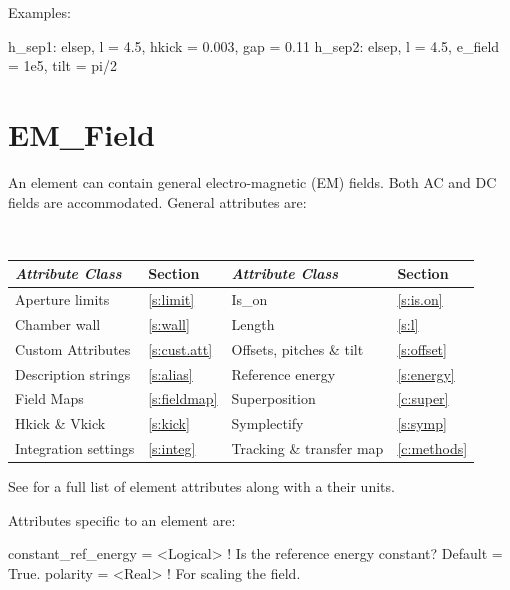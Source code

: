 Examples:
\begin{example}
  h_sep1: elsep, l = 4.5, hkick = 0.003, gap = 0.11
  h_sep2: elsep, l = 4.5, e_field = 1e5, tilt = pi/2
\end{example}

\newpage

\section{EM_Field}
\label{s:em.field}

An  element can contain general electro-magnetic (EM)
fields. Both AC and DC fields are accommodated.  General 
attributes are:
\begin{center}
\tt
\begin{tabular}{llll} \toprule
  {\sl Attribute Class}      & Section           & {\sl Attribute Class}      & Section         \\ \midrule
  Aperture limits            & \ref{s:limit}     & Is_on                      & \ref{s:is.on}   \\
  Chamber wall               & \ref{s:wall}      & Length                     & \ref{s:l}       \\ 
  Custom Attributes          & \ref{s:cust.att}  & Offsets, pitches \& tilt   & \ref{s:offset}  \\
  Description strings        & \ref{s:alias}     & Reference energy           & \ref{s:energy}  \\
  Field Maps                 & \ref{s:fieldmap}  & Superposition              & \ref{c:super}   \\
  Hkick \& Vkick             & \ref{s:kick}      & Symplectify                & \ref{s:symp}    \\
  Integration settings       & \ref{s:integ}     & Tracking \& transfer map   & \ref{c:methods} \\
  \bottomrule
\end{tabular}
\end{center}
\toffset
See  for a full list of element attributes along with a their units.

Attributes specific to an  element are:
\begin{example}
  constant_ref_energy = <Logical> ! Is the reference energy constant? Default = True.
  polarity   = <Real>  ! For scaling the field.
\end{example}

